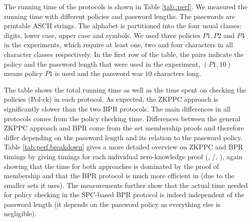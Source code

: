 \begin{table}[!t]
\begin{center}
\vspace*{1em}
\caption[BPR Protocol Performance]{Protocol Performance (Running Time in Milliseconds)} \label{tab::perf}
\end{center}
\end{table} 

The running time of the protocols is shown in Table \ref{tab::perf}. We measured the running time with different policies and password lengths. The passwords are printable \ac{ASCII} strings. 
The alphabet is partitioned into the four usual classes: digits, lower case, upper case and symbols. 
We used three policies $P1, P2$ and $P4$ in the experiments, which require at least one, two and four characters in all character classes respectively. 
In the first row of the table, the pairs indicate the policy and the password length that were used in the experiment, \eg $(P1, 10)$ means policy $P1$ is used and the password was $10$ characters long. 

The table shows the total running time as well as the time spent on checking the policies (Pol-ck) in each protocol. 
As expected, the \ac{ZKPPC} approach is significantly slower than the two \ac{BPR} protocols.
The main differences in all protocols comes from the policy checking time.
Differences between the general \ac{ZKPPC} approach and \ac{BPR} come from the set membership proofs and therefore differ depending on the password length and its relation to the password policy.
Table \ref{tab:perf:breakdown} gives a more detailed overview on \ac{ZKPPC} and \ac{BPR} timings by giving timings for each individual zero-knowledge proof (\PoM, \PoE/\PoC, \PoS), again showing that the time for both approaches is dominated by the proof of membership and that the \ac{BPR} protocol is much more efficient in \PoM (due to the smaller sets it uses).
The measurements further show that the actual time needed for policy checking in the \ac{SPC}-based \ac{BPR} protocol is indeed independent of the password length (it depends on the password policy as everything else is negligible).

